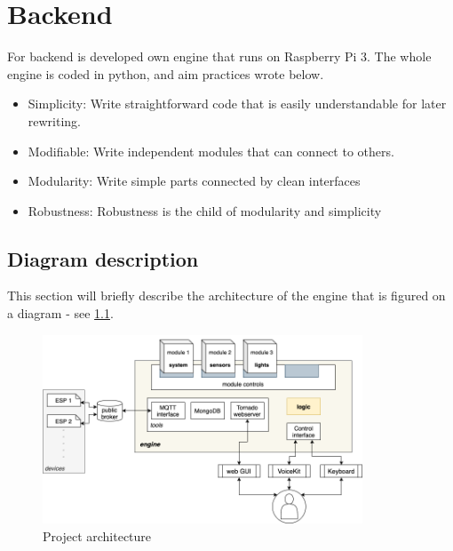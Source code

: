 \chapter{Backend} \label{chap:backend}



For backend is developed own engine that runs on Raspberry Pi 3. The whole engine is coded in python, and aim practices wrote below.
\begin{itemize}
	\item Simplicity: Write straightforward code that is easily understandable for later rewriting.
	\item Modifiable: Write independent modules that can connect to others.
	\item Modularity: Write simple parts connected by clean interfaces
	\item Robustness: Robustness is the child of modularity and simplicity
\end{itemize}


\section{Diagram description} \label{section:diagram description}

This section will briefly describe the architecture of the engine that is figured on a diagram - see  \cref{fig:vh_project_design}.

\begin{figure}[H]
  \centering
  \includegraphics[width=0.85\textwidth]{img/vh_project_design.png}
  \caption{Project architecture}
  \label{fig:vh_project_design}
\end{figure}

